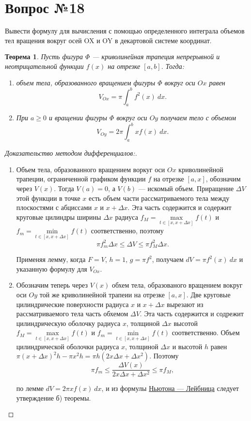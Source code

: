 \documentclass[12pt]{report}
\numberwithin{equation}{section}
\newtheorem{theorem}{Теорема}[section]
\begin{document}
\newpage \section{Вопрос №18} %
\begin{framed}
Вывести формулу для вычисления с помощью определенного интеграла объемов тел вращения вокруг осей OX и OY в декартовой системе координат.
\end{framed}

\begin{theorem} \label{th:18:1}
Пусть фигура $\Phi$ --- криволинейная трапеция непрерывной и неотрицательной функции $f(x)$ на отрезке $[a,b]$. Тогда:
\begin{enumerate}
\item[a)] объем тела, образованного вращением фигуры $\Phi$ вокруг оси $Ox$ равен
\[ V_{Ox} = \pi \int_a^b f^2(x)~dx.\]
\item[б)] При $a \geqslant 0$ и вращении фигуры $\Phi$ вокруг оси $Oy$ получаем тело с объемом
\[ V_{Oy} = 2 \pi \int_a^b x f(x)~dx.\]
\end{enumerate}
\end{theorem}
\begin{proof}[Доказательство методом дифференциалов:]
~\\
\begin{enumerate}
\item[a)] Объем тела, образованного вращением воркуг оси $Ox$ криволинейной трапеции, ограниченной графиком функции $f$ на отрезке $[a,x]$, обозначим через $V(x)$. Тогда $V(a) = 0$, а $V(b)$ --- искомый объем. Приращение $\Delta V$ этой функции в точке $x$ есть объем части рассматриваемого тела между плоскостями с абциссами $x$ и $x + \Delta x$. Эта часть содержится и содержит круговые цилиндры ширины $\Delta x$ радиуса $f_M = \max\limits_{t \in [x, x + \Delta x]} f(t)$ и $f_m = \min\limits_{t \in [x, x + \Delta x]}f(t)$ соответственно, поэтому
\[ \pi f^2_m \Delta x \leqslant \Delta V \leqslant \pi f^2_M \Delta x.\]

Применяя лемму, когда $F = V$, $h = 1$, $g = \pi f^2$, получаем $dV = \pi f^2(x)~dx$ и указанную формулу для $V_{Ox}$.

\item[б)] Обозначим теперь через $V(x)$ обхем тела, образованого вращением вокруг оси $Oy$ той же криволинейной трапеии на отрезке  $[a,x]$. Две круговые цилиндрические поверхности радиуса $x$ и $x + \Delta x$ вырезают из рассматриваемого тела часть обхемом $\Delta V$. Эта часть содержится и содрежит цилиндрическую оболочку радиуса $x$, толщиной $\Delta x$ высотой  $f_M = \max\limits_{t \in [x, x + \Delta x]} f(t)$ и $f_m = \min\limits_{t \in [x, x + \Delta x]}f(t)$ соответственно. Объем цилиндрической оболочки радиуса $x$, толщиной $\Delta x$ и высотой $h$ равен $\pi (x + \Delta x)^2 h - \pi x^2 h = \pi h(2x \Delta x + \Delta x^2)$. Поэтому
\[ \pi f_m \leqslant \frac{\Delta V(x)}{2x \Delta x + \Delta x^2} \leqslant \pi f_M,\]

по лемме $dV = 2\pi x f(x)~dx$, и из формулы  \hyperref[th:11:1]{Ньютона --- Лейбница} следует утверждение б) теоремы.
\end{enumerate}
\end{proof}
\end{document}
